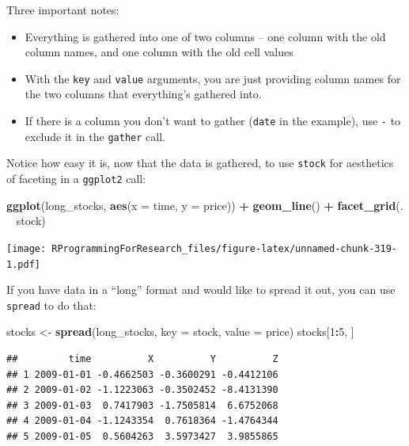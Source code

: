 \documentclass[]{book}
\makeatletter
\newenvironment{Shaded}{\begin{snugshade}}{\end{snugshade}}
\newcommand{\KeywordTok}[1]{\textcolor[rgb]{0.13,0.29,0.53}{\textbf{#1}}}
\newcommand{\DataTypeTok}[1]{\textcolor[rgb]{0.13,0.29,0.53}{#1}}
\newcommand{\DecValTok}[1]{\textcolor[rgb]{0.00,0.00,0.81}{#1}}
\newcommand{\StringTok}[1]{\textcolor[rgb]{0.31,0.60,0.02}{#1}}
\newcommand{\OperatorTok}[1]{\textcolor[rgb]{0.81,0.36,0.00}{\textbf{#1}}}
\newcommand{\NormalTok}[1]{#1}
\providecommand{\tightlist}{%
  \setlength{\itemsep}{0pt}\setlength{\parskip}{0pt}}
\newenvironment{kframe}{%
\medskip{}
\setlength{\fboxsep}{.8em}
 \def\at@end@of@kframe{}%
 \ifinner\ifhmode%
  \def\at@end@of@kframe{\end{minipage}}%
  \begin{minipage}{\columnwidth}%
 \fi\fi%
 \def\FrameCommand##1{\hskip\@totalleftmargin \hskip-\fboxsep
 \colorbox{shadecolor}{##1}\hskip-\fboxsep
     \hskip-\linewidth \hskip-\@totalleftmargin \hskip\columnwidth}%
 \MakeFramed {\advance\hsize-\width
   \@totalleftmargin\z@ \linewidth\hsize
   \@setminipage}}%
 {\par\unskip\endMakeFramed%
 \at@end@of@kframe}
\renewenvironment{Shaded}{\begin{kframe}}{\end{kframe}}
\theoremstyle{definition}
\theoremstyle{definition}
\theoremstyle{definition}
\theoremstyle{remark}
\makeatother
\begin{document}
Three important notes:

\begin{itemize}
\tightlist
\item
  Everything is gathered into one of two columns -- one column with the
  old column names, and one column with the old cell values
\item
  With the \texttt{key} and \texttt{value} arguments, you are just
  providing column names for the two columns that everything's gathered
  into.
\item
  If there is a column you don't want to gather (\texttt{date} in the
  example), use \texttt{-} to exclude it in the \texttt{gather} call.
\end{itemize}

Notice how easy it is, now that the data is gathered, to use
\texttt{stock} for aesthetics of faceting in a \texttt{ggplot2} call:

\begin{Shaded}
\begin{Highlighting}[]
\KeywordTok{ggplot}\NormalTok{(long_stocks, }\KeywordTok{aes}\NormalTok{(}\DataTypeTok{x =}\NormalTok{ time, }\DataTypeTok{y =}\NormalTok{ price)) }\OperatorTok{+}\StringTok{ }
\StringTok{  }\KeywordTok{geom_line}\NormalTok{() }\OperatorTok{+}\StringTok{ }
\StringTok{  }\KeywordTok{facet_grid}\NormalTok{(. }\OperatorTok{~}\StringTok{ }\NormalTok{stock)}
\end{Highlighting}
\end{Shaded}

\texttt{[image: RProgrammingForResearch\_files/figure-latex/unnamed-chunk-319-1.pdf]}

If you have data in a ``long'' format and would like to spread it out,
you can use \texttt{spread} to do that:

\begin{Shaded}
\begin{Highlighting}[]
\NormalTok{stocks <-}\StringTok{ }\KeywordTok{spread}\NormalTok{(long_stocks, }\DataTypeTok{key =}\NormalTok{ stock, }\DataTypeTok{value =}\NormalTok{ price)}
\NormalTok{stocks[}\DecValTok{1}\OperatorTok{:}\DecValTok{5}\NormalTok{, ]}
\end{Highlighting}
\end{Shaded}

\begin{verbatim}
##         time          X          Y          Z
## 1 2009-01-01 -0.4662503 -0.3600291 -0.4412106
## 2 2009-01-02 -1.1223063 -0.3502452 -8.4131390
## 3 2009-01-03  0.7417903 -1.7505814  6.6752068
## 4 2009-01-04 -1.1243354  0.7618364 -1.4764344
## 5 2009-01-05  0.5604263  3.5973427  3.9855865
\end{verbatim}
\end{document}
